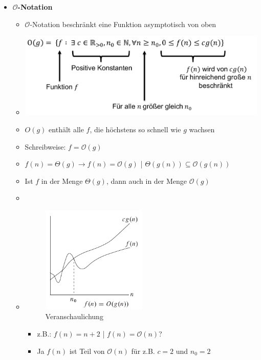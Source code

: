 \documentclass[
    ngerman,
    color=3b,
    load_common, %
    summary,
    boxarc,
]{tuda_summary}
\begin{document}
\begin{itemize}
    \item \textbf{$\mathcal{O}$-Notation}
          \begin{itemize}
              \item $\mathcal{O}$-Notation beschränkt eine Funktion asymptotisch von oben
              \item[] \includegraphics[width=12cm]{pictures/oNotation.pdf}
              \item $O(g)$ enthält alle $f$, die höchstens so schnell wie $g$ wachsen
              \item Schreibweise: $f=\mathcal{O}(g)$
              \item $f(n)=\Theta(g) \rightarrow f(n) = \mathcal{O}(g)$ | $\Theta(g(n)) \subseteq \mathcal{O}(g(n))$
              \item Ist $f$ in der Menge $\Theta(g)$, dann auch in der Menge $\mathcal{O}(g)$
              \item[]
              \item[]
                    \begin{minipage}{0.3\textwidth}
                        \begin{figure}[H]
                            \centering
                            \includegraphics[width=5cm]{pictures/oNotationGraph.pdf}
                            \caption{Veranschaulichung}
                            \label{}
                        \end{figure}
                    \end{minipage}
                    \begin{minipage}[t]{0.6\textwidth}
                        \vspace{-3cm}
                        \begin{itemize}
                            \item z.B.: $f(n) = n + 2$ | $f(n) = \mathcal{O}(n)$?
                            \item Ja $f(n)$ ist Teil von $\mathcal{O}(n)$ für z.B. $c = 2$ und $n_0 = 2$
                        \end{itemize}
                    \end{minipage}
          \end{itemize}


\end{itemize}
\end{document}

